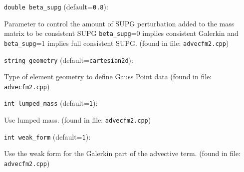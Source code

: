 \item\verb+double beta_supg+ {\rm(default=\verb|0.8|)}:

Parameter to control the amount of SUPG perturbation 
    added to the mass matrix to be consistent SUPG
    \verb+beta_supg+=0 implies consistent Galerkin and
    \verb+beta_supg+=1 implies full consistent SUPG. 
 (found in file: \verb+advecfm2.cpp+)
\item\verb+string geometry+ {\rm(default=\verb|cartesian2d|)}:

Type of element geometry to define Gauss Point data
 (found in file: \verb+advecfm2.cpp+)
\item\verb+int lumped_mass+ {\rm(default=\verb|1|)}:

Use lumped mass.
 (found in file: \verb+advecfm2.cpp+)
\item\verb+int weak_form+ {\rm(default=\verb|1|)}:

Use the weak form for the Galerkin part of the advective term. 
 (found in file: \verb+advecfm2.cpp+)
